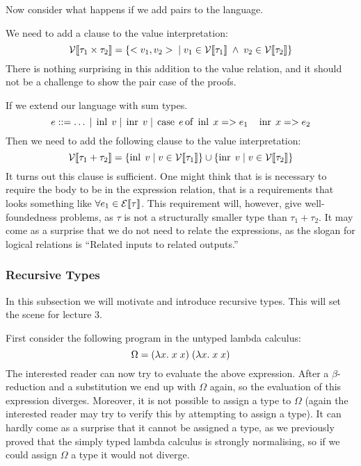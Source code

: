 Now consider what happens if we add pairs to the language. 
\begin{comment}
\begin{align*}
  &\fst <v_1,v_2> \evalto v_1 \\
  &\snd <v_1,v_2> \evalto v_2
\end{align*}
\end{comment}
We need to add a clause to the value interpretation:
\[
  \mathcal{V}\llbracket \tau_1 \times \tau_2 \rrbracket = \{<v_1,v_2> \; | \; v_1 \in \mathcal{V}\llbracket \tau_1 \rrbracket \; \wedge \; v_2 \in \mathcal{V}\llbracket \tau_2 \rrbracket\}
\]
There is nothing surprising in this addition to the value relation, and it should not be a challenge to show the pair case of the proofs.

If we extend our language with sum types. %
\[
e::= \dots \; | \; \operatorname{inl} \; v \; | \; \operatorname{inr} \; v \; | \; \operatorname{case} \; e \operatorname{of} \; \operatorname{inl} \; x => e_1 \quad \operatorname{inr} \; x => e_2
\]
Then we need to add the following clause to the value interpretation:
\[
  \mathcal{V}\llbracket \tau_1 + \tau_2 \rrbracket = \{\operatorname{inl} \; v \; | \; v \in \mathcal{V}\llbracket \tau_1 \rrbracket\} \cup
                           \{\operatorname{inr} \; v \; | \; v \in \mathcal{V}\llbracket \tau_2 \rrbracket\}
\]
It turns out this clause is sufficient. One might think that is is necessary to require the body to be in the expression relation, that is a requirements that looks something like $\forall e_1 \in \mathcal{E}\llbracket \tau \rrbracket$. This requirement will, however, give well-foundedness problems, as $\tau$ is not a structurally smaller type than $\tau_1 + \tau_2$. It may come as a surprise that we do not need to relate the expressions, as the slogan for logical relations is ``Related inputs to related outputs.''

\subsubsection*{Recursive Types}
In this subsection we will motivate and introduce recursive types. This will set the scene for lecture 3.

First consider the  following program in the untyped lambda calculus:
\[
  \Omega = (\lambda x . \; x \; x) \; (\lambda x . \; x \; x)
\]
The interested reader can now try to evaluate the above expression. After a $\beta$-reduction and a substitution we end up with $\Omega$ again, so the evaluation of this expression diverges. Moreover, it is not possible to assign a type to $\Omega$ (again the interested reader may try to verify this by attempting to assign a type). It can hardly come as a surprise that it cannot be assigned a type, as we previously proved that the simply typed lambda calculus is strongly normalising, so if we could assign $\Omega$ a type it would not diverge.


